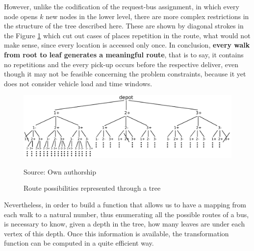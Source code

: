 \documentclass[tuberlin,cic,tc,openright,english,noabntcite,oneside]{iiufrgs}
\begin{document}
However, unlike the codification of the request-bus assignment, in which every node opens $k$ new nodes in the lower level, there are more complex restrictions in the structure of the tree described here. These are shown by diagonal strokes in the Figure \ref{fig:tree_bus_route} which cut out cases of places repetition in the route, what would not make sense, since every location is accessed only once. In conclusion, \textbf{every walk from root to leaf generates a meaningful route}, that is to say, it contains no repetitions and the every pick-up occurs before the respective deliver, even though it may not be feasible concerning the problem constraints, because it yet does not consider vehicle load and time windows.
\begin{figure}[H]
	\centering
    \caption{Route possibilities represented through a tree}
    \includegraphics[width=\textwidth]{fig_tree_bus_route}\par
    Source: Own authorship
    \label{fig:tree_bus_route}
\end{figure}

Nevertheless, in order to build a function that allows us to have a mapping from each walk to a natural number, thus enumerating all the possible routes of a bus, is necessary to know, given a depth in the tree, how many leaves are under each vertex of this depth. Once this information is available, the transformation function can be computed in a quite efficient way.
\end{document}
